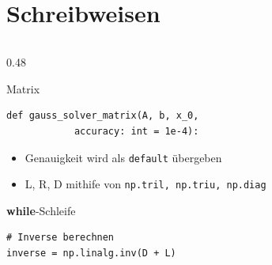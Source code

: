 \documentclass{beamer}
\begin{document}


\section{Schreibweisen}
\begin{frame}[fragile]
\begin{columns}[T]
  \begin{column}{0.48\textwidth}
    \begin{block}{\small{Matrix}}
      \begin{lstlisting}
def gauss_solver_matrix(A, b, x_0, 
            accuracy: int = 1e-4):
      \end{lstlisting}
      \tiny{
        \begin{itemize}
          \item Genauigkeit wird als \texttt{default} übergeben
          \item L, R, D mithife von \texttt{np.tril, np.triu, np.diag}
        \end{itemize}
        \begin{block}{\small{\textbf{while}-Schleife}}
  
          \begin{lstlisting}
# Inverse berechnen
inverse = np.linalg.inv(D + L)


\end{lstlisting}
\end{block}}
\end{block}
\end{column}
\end{columns}
\end{frame}
\end{document}
